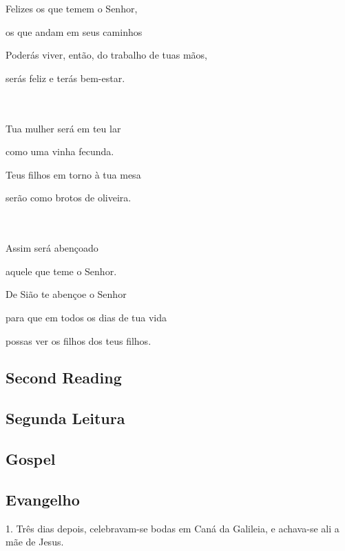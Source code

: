 \documentclass[10pt,a5]{article}
\newcommand \subsect[2] {\subsection*{#1} \switchcolumn \subsection*{#2} \switchcolumn*}
\begin{document}
\begin{paracol}{2}
Felizes os que temem o Senhor,  

\hspace*{2em}os que andam em seus caminhos

Poderás viver, então, do trabalho de tuas mãos,

\hspace*{2em}serás feliz e terás bem-estar.

\\
\\

Tua mulher será em teu lar

\hspace*{2em}como uma vinha fecunda.

Teus filhos em torno à tua mesa 

\hspace*{2em}serão como brotos de oliveira.

\\
\\

Assim será abençoado 

\hspace*{2em}aquele que teme o Senhor.

De Sião te abençoe o Senhor 

\hspace*{2em}para que em todos os dias de tua vida

\hspace*{2em}possas ver os filhos dos teus filhos.


 \switchcolumn*

 \subsect{Second Reading}{Segunda Leitura}



 \switchcolumn



 \switchcolumn*

 \subsect{Gospel}{Evangelho}



 \switchcolumn

 1.
Três dias depois, celebravam-se bodas em Caná da Galileia, e achava-se ali a mãe de Jesus.


\end{paracol}
\end{document}
